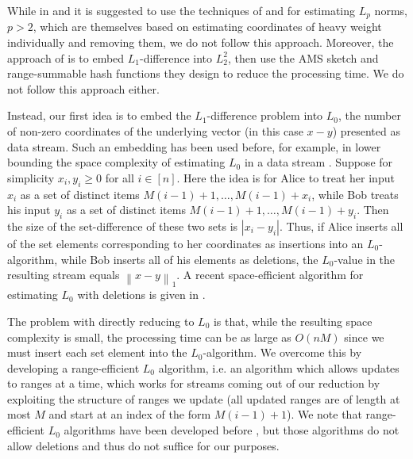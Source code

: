 \documentclass[letterpaper,11pt]{article}
\newcommand{\norm}[1]{\left\lVert #1 \right\rVert}
\begin{document}
While in \cite{CG07} and \cite{IITK} it is suggested to use the
techniques of \cite{bgks06} and \cite{IW} for estimating $L_p$ norms,
$p > 2$, which are themselves based on estimating coordinates of heavy
weight
individually and removing them, we do not follow this
approach. Moreover, the approach of \cite{FKSV02} is to embed
$L_1$-difference into $L_2^2$, then use the AMS sketch \cite{AMS99}
and range-summable hash functions they design
to reduce the processing time. We do not follow this approach either.

Instead, our first idea is to embed the $L_1$-difference problem into
$L_0$, the number of non-zero coordinates of the underlying vector 
(in this case $x-y$) presented as data stream. Such an
embedding has been used before, for example, in lower bounding the
space complexity of estimating $L_0$ in a data stream
\cite{IW03}.  Suppose for simplicity $x_i,y_i\ge 0$ for all $i\in
[n]$. Here the idea is for Alice to treat her input $x_i$ as a
set of distinct items $M(i-1)+1, \ldots, M(i-1) + x_i$, while Bob
treats his input $y_i$ as a set of distinct items $M(i-1) + 1,
\ldots, M(i-1) + y_i$. Then the size of the set-difference of these
two sets is $|x_i-y_i|$. Thus, if Alice inserts all of the set
elements corresponding to her coordinates as insertions into an
$L_0$-algorithm, while Bob inserts all of his elements as deletions,
the $L_0$-value
in the resulting stream equals $\norm{x-y}_1$. A recent
space-efficient algorithm for estimating $L_0$ with deletions
is given in \cite{KNW08}.

The problem with directly reducing to $L_0$ is that, while the
resulting space complexity is small, the processing time can be as
large as $O(nM)$ since we
must insert each set element into the $L_0$-algorithm. We overcome
this by developing a range-efficient $L_0$ algorithm, i.e. an
algorithm which allows updates to ranges at a time,
which works for streams coming out of our reduction by exploiting the
structure of ranges we update (all updated ranges
are of length at most $M$ and start at an index of the form $M(i-1)+1$).
We note that range-efficient $L_0$ algorithms have been
developed before \cite{BKS02,PavanTir07}, but those algorithms do
not allow deletions and thus do not suffice for our purposes.
\end{document}
